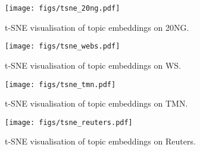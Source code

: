 \documentclass{article}
\begin{document}
\begin{figure}
\centering
\texttt{[image: figs/tsne\_20ng.pdf]}
\caption{t-SNE visualisation of topic embeddings on 20NG.}
\label{fig-tsne-20ng}
\end{figure}

\begin{figure}
\centering
\texttt{[image: figs/tsne\_webs.pdf]}
\caption{t-SNE visualisation of topic embeddings on WS.}
\label{fig-tsne-ws}
\end{figure}

\begin{figure}
\centering
\texttt{[image: figs/tsne\_tmn.pdf]}
\caption{t-SNE visualisation of topic embeddings on TMN.}
\label{fig-tsne-tmn}
\end{figure}

\begin{figure}
\centering
\texttt{[image: figs/tsne\_reuters.pdf]}
\caption{t-SNE visualisation of topic embeddings on Reuters.}
\label{fig-tsne-reuters}
\end{figure}
\end{document}
